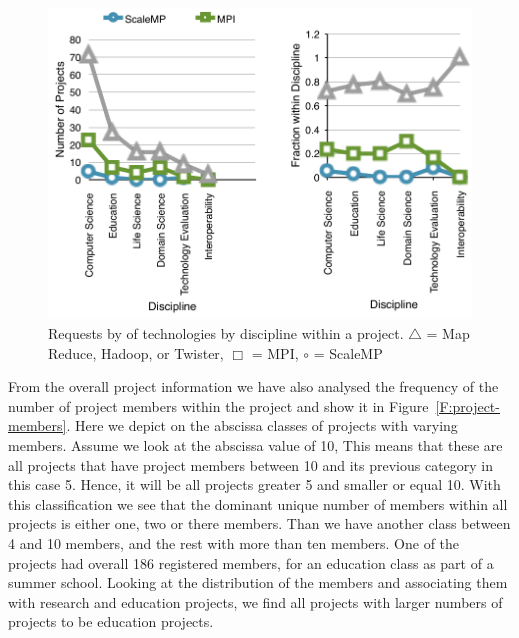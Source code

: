 \begin{figure}[p]
  \centering
    \includegraphics[width=.75\textwidth]{images/trend-b.pdf}
  \caption{Requests by of technologies by discipline within a
    project. $\bigtriangleup$ = Map Reduce, Hadoop, or Twister,
    $\Box$  = MPI, $\circ$ = ScaleMP}
   \label{F:trend-b}
\end{figure}

From the overall project information we have also analysed the
frequency of the number of project members within the project and show
it in Figure~\ref{F:project-members}. Here we depict on the abscissa
classes of projects with varying members.  Assume we look at the
abscissa value of 10, This means that these are all projects that
have project members between 10 and its previous category in this case
5. Hence, it will be all projects greater  5 and smaller or equal
10. With this classification  we see that the dominant unique number of
members within all projects is either one, two or there members. Than
we have another class between 4 and 10 members, and the rest with more
than ten members. One of the projects had overall 186 registered
members, for an education class as part of a summer school. Looking at
the distribution of the members and associating them with research and
education projects, we find all projects with larger numbers of
projects to be education projects.





